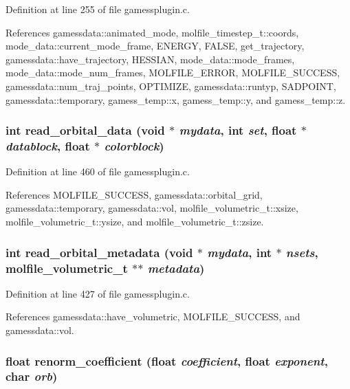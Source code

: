 Definition at line 255 of file gamessplugin.c.

References gamessdata::animated\_\-mode, molfile\_\-timestep\_\-t::coords, mode\_\-data::current\_\-mode\_\-frame, ENERGY, FALSE, get\_\-trajectory, gamessdata::have\_\-trajectory, HESSIAN, mode\_\-data::mode\_\-frames, mode\_\-data::mode\_\-num\_\-frames, MOLFILE\_\-ERROR, MOLFILE\_\-SUCCESS, gamessdata::num\_\-traj\_\-points, OPTIMIZE, gamessdata::runtyp, SADPOINT, gamessdata::temporary, gamess\_\-temp::x, gamess\_\-temp::y, and gamess\_\-temp::z.
\subsubsection{\setlength{\rightskip}{0pt plus 5cm}int read\_\-orbital\_\-data (void $\ast$ {\em mydata}, int {\em set}, float $\ast$ {\em datablock}, float $\ast$ {\em colorblock})\hspace{0.3cm}{\tt  [static]}}\label{gamessplugin_8c_a8}




Definition at line 460 of file gamessplugin.c.

References MOLFILE\_\-SUCCESS, gamessdata::orbital\_\-grid, gamessdata::temporary, gamessdata::vol, molfile\_\-volumetric\_\-t::xsize, molfile\_\-volumetric\_\-t::ysize, and molfile\_\-volumetric\_\-t::zsize.
\subsubsection{\setlength{\rightskip}{0pt plus 5cm}int read\_\-orbital\_\-metadata (void $\ast$ {\em mydata}, int $\ast$ {\em nsets}, {\bf molfile\_\-volumetric\_\-t} $\ast$$\ast$ {\em metadata})\hspace{0.3cm}{\tt  [static]}}\label{gamessplugin_8c_a7}




Definition at line 427 of file gamessplugin.c.

References gamessdata::have\_\-volumetric, MOLFILE\_\-SUCCESS, and gamessdata::vol.
\subsubsection{\setlength{\rightskip}{0pt plus 5cm}float renorm\_\-coefficient (float {\em coefficient}, float {\em exponent}, char {\em orb})}\label{gamessplugin_8c_a23}




